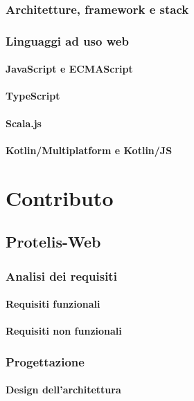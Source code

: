 \documentclass[%
  a4paper,                %
  12pt,                   %
  twoside,                %
  openright,              %
  titlepage,              %
  final                   %
]{scrbook}
\begin{document}
      \section{Architetture, framework e stack}
      \section{Linguaggi ad uso web}
        \subsection{JavaScript e ECMAScript}
        \subsection{TypeScript}
        \subsection{Scala.js}
        \subsection{Kotlin/Multiplatform e Kotlin/JS}

  \part{Contributo}
    \chapter{Protelis-Web}
      \section{Analisi dei requisiti}
        \subsection{Requisiti funzionali}
        \subsection{Requisiti non funzionali}
      \section{Progettazione}
        \subsection{Design dell'architettura}
\end{document}

